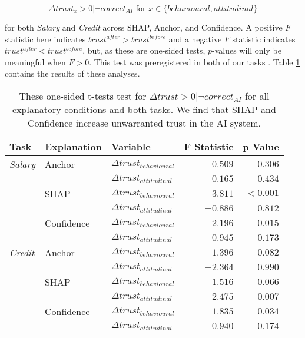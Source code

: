 \begin{equation}
    \Delta trust_{x} > 0 | \neg correct_{AI} \text{ for } x \in \{behavioural, attitudinal\}
\end{equation}

\noindent for both \emph{Salary} and \emph{Credit} across SHAP, Anchor, and Confidence. A positive $F$ statistic here indicates $trust^{after} > trust^{before}$ and a negative $F$ statistic indicates $trust^{after} < trust^{before}$, but, as these are one-sided tests, $p$-values will only be meaningful when $F > 0$. This test was preregistered in both of our tasks \cite{natarajan_binns_2022}. Table \ref{tab:delta-trust-t} contains the results of these analyses.  

\begin{table}[htb]
    \centering
    \caption{These one-sided t-tests test for $\Delta trust > 0 | \neg correct_{AI}$ for all explanatory conditions and both tasks. We find that SHAP and Confidence increase unwarranted trust in the AI system.}
    \label{tab:delta-trust-t}
    \begin{tabular}{lllrr}
        \toprule
        Task & Explanation & Variable & F Statistic & p Value \\ 
        \midrule
        \emph{Salary} & Anchor & $\Delta trust_{behavioural}$ & $0.509$ & $0.306$ \\
        & & $\Delta trust_{attitudinal}$ & $0.165$ & $0.434$ \\
        & SHAP & $\Delta trust_{behavioural}$ & $\mathbf{3.811}$ & $\mathbf{<0.001}$ \\
        & & $\Delta trust_{attitudinal}$ & $-0.886$ & $0.812$ \\
        & Confidence & $\Delta trust_{behavioural}$ & $\mathbf{2.196}$ & $\mathbf{0.015}$ \\
        & & $\Delta trust_{attitudinal}$ & $0.945$ & $0.173$ \\
        \midrule
        \emph{Credit} & Anchor & $\Delta trust_{behavioural}$ & $1.396$ & $0.082$ \\
        & & $\Delta trust_{attitudinal}$ & $-2.364$ & $0.990$ \\
        & SHAP & $\Delta trust_{behavioural}$ & $1.516$ & $0.066$ \\
        & & $\Delta trust_{attitudinal}$ & $\mathbf{2.475}$ & $\mathbf{0.007}$ \\
        & Confidence & $\Delta trust_{behavioural}$ & $\mathbf{1.835}$ & $\mathbf{0.034}$ \\
        & & $\Delta trust_{attitudinal}$ & $0.940$ & $0.174$ \\
        \bottomrule
    \end{tabular}
\end{table}

